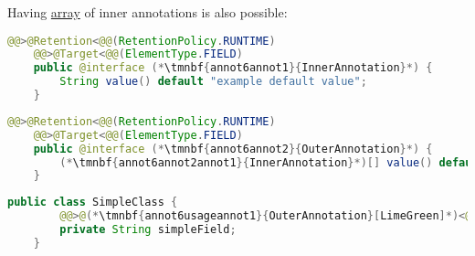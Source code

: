 \enlargethispage{20mm}
\noindent Having \hyperref[javaarray]{array} of inner annotations is also possible:
\begin{lstlisting}[language=Java, title={Inner annotation}]
    @@>@Retention<@@(RetentionPolicy.RUNTIME)
    @@>@Target<@@(ElementType.FIELD)
    public @interface (*\tmnbf{annot6annot1}{InnerAnnotation}*) {
        String value() default "example default value";
    }
\end{lstlisting}
\begin{lstlisting}[language=Java, title={Outer annotation}]
    @@>@Retention<@@(RetentionPolicy.RUNTIME)
    @@>@Target<@@(ElementType.FIELD)
    public @interface (*\tmnbf{annot6annot2}{OuterAnnotation}*) {
        (*\tmnbf{annot6annot2annot1}{InnerAnnotation}*)[] value() default {@@>@(*\tmnbf{annot6annot2annot2}{InnerAnnotation}[LimeGreen]*)<@@("overridden default value")};
    }
\end{lstlisting}
\begin{lstlisting}[language=Java, title={Usage}]
    public class SimpleClass {
        @@>@(*\tmnbf{annot6usageannot1}{OuterAnnotation}[LimeGreen]*)<@@({@@>@(*\tmnbf{annot6usageannot2}{InnerAnnotation}[LimeGreen]*)<@@("new value"), @@>@(*\tmnbf{annot6usageannot3}{InnerAnnotation}[LimeGreen]*)<@@("another value")})
        private String simpleField;
    }
\end{lstlisting}
\newpage

